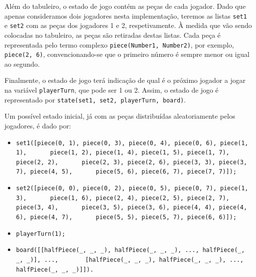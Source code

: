 \documentclass[a4paper]{article}
\begin{document}
Além do tabuleiro, o estado de jogo contém as peças de cada jogador. Dado que apenas consideramos dois jogadores nesta implementação, teremos as listas \verb|set1| e \verb|set2| com as peças dos jogadores 1 e 2, respetivamente. À medida que vão sendo colocadas no tabuleiro, as peças são retiradas destas listas. Cada peça é representada pelo termo complexo \verb|piece(Number1, Number2)|, por exemplo, \verb|piece(2, 6)|, convencionando-se que o primeiro número é sempre menor ou igual ao segundo.

Finalmente, o estado de jogo terá indicação de qual é o próximo jogador a jogar na variável \verb|playerTurn|, que pode ser 1 ou 2. Assim, o estado de jogo é representado por \verb|state(set1, set2, playerTurn, board)|.

Um possível estado inicial, já com as peças distribuídas aleatoriamente pelos jogadores, é dado por:
\begin{itemize}
\item 
\verb|set1([piece(0, 1), piece(0, 3), piece(0, 4), piece(0, 6), piece(1, 1),|\linebreak
\verb|      piece(1, 2), piece(1, 4), piece(1, 5), piece(1, 7), piece(2, 2),|\linebreak
\verb|      piece(2, 3), piece(2, 6), piece(3, 3), piece(3, 7), piece(4, 5),|\linebreak
\verb|      piece(5, 6), piece(6, 7), piece(7, 7)]);|
\item
\verb|set2([piece(0, 0), piece(0, 2), piece(0, 5), piece(0, 7), piece(1, 3),|\linebreak
\verb|      piece(1, 6), piece(2, 4), piece(2, 5), piece(2, 7), piece(3, 4),|\linebreak
\verb|      piece(3, 5), piece(3, 6), piece(4, 4), piece(4, 6), piece(4, 7),|\linebreak
\verb|      piece(5, 5), piece(5, 7), piece(6, 6)]);|
\item \verb|playerTurn(1);|	
\item 
\verb|board([[halfPiece(_, _, _), halfPiece(_, _, _), ..., halfPiece(_, _, _)], ...,|\linebreak
\verb|       [halfPiece(_, _, _), halfPiece(_, _, _), ..., halfPiece(_, _, _)]]).|
\end{itemize}
\end{document}
